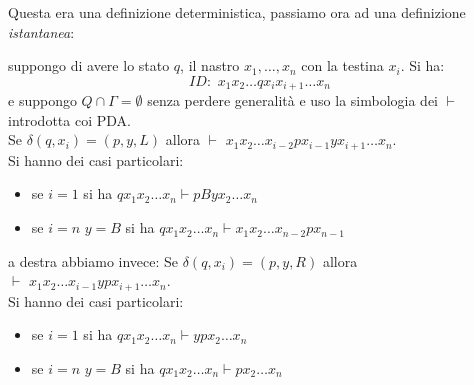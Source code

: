 \newpage
Questa era una definizione deterministica, passiamo ora ad una definizione \textit{istantanea}:
\begin{definition}
suppongo di avere lo stato $q$, il nastro $x_1,\ldots ,x_n$ con la testina $x_i$. Si ha:
$$ID:\,\,x_1x_2\ldots qx_ix_{i+1}\ldots x_n$$
e suppongo $Q\cap\Gamma=\emptyset$ senza perdere generalità e uso la simbologia dei $\vdash$ introdotta coi PDA. \\
Se $\delta(q,x_i)=(p,y,L)$ allora $\vdash\,\, x_1x_2\ldots x_{i-2}px_{i-1}yx_{i+1}\ldots x_n$.\\
Si hanno dei casi particolari:
\begin{itemize}
\item se $i=1$ si ha $qx_1x_2\ldots x_n\vdash pByx_2\ldots x_n$
\item se $i=n\,\,y=B$ si ha $qx_1x_2\ldots x_n\vdash x_1x_2\ldots x_{n-2}px_{n-1}$
\end{itemize}
a destra abbiamo invece:
Se $\delta(q,x_i)=(p,y,R)$ allora $\vdash\,\, x_1x_2\ldots x_{i-1}ypx_{i+1}\ldots x_n$.\\
Si hanno dei casi particolari:
\begin{itemize}
\item se $i=1$ si ha $qx_1x_2\ldots x_n\vdash ypx_2\ldots x_n$
\item se $i=n\,\,y=B$ si ha $qx_1x_2\ldots x_n\vdash px_2\ldots x_n$
\end{itemize}
\end{definition}
